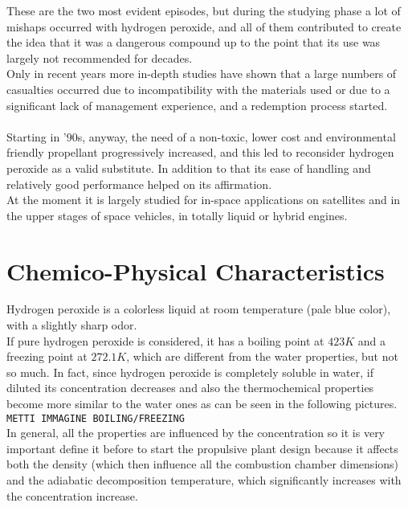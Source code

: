 \documentclass[a4paper]{report}
\begin{document}
These are the two most evident episodes, but during the studying phase a lot of mishaps occurred with hydrogen peroxide, and all of them contributed to create the idea that it was a dangerous compound up to the point that its use was largely not recommended for decades. \\
Only in recent years more in-depth studies have shown that a large numbers of casualties occurred due to incompatibility with the materials used or due to a significant lack of management experience, and a redemption process started. \\ 
\\
Starting in '90s, anyway, the need of a non-toxic, lower cost and environmental friendly propellant progressively increased, and this led to reconsider hydrogen peroxide as a valid substitute. In addition to that its ease of handling and relatively good performance helped on its affirmation.\\
At the moment it is largely studied for in-space applications on satellites and in the upper stages of space vehicles, in totally liquid or hybrid engines. \\

\section{Chemico-Physical Characteristics}

Hydrogen peroxide is a colorless liquid at room temperature (pale blue color), with a slightly sharp odor. \\
If pure hydrogen peroxide is considered, it has a boiling point at $423 K$ and a freezing point at $272.1 K$, which are different from the water properties, but not so much. In fact, since hydrogen peroxide is completely soluble in water, if diluted its concentration decreases and also the thermochemical properties become more similar to the water ones as can be seen in the following pictures. \\

\texttt{\color{red}METTI IMMAGINE BOILING/FREEZING}\\

In general, all the properties are influenced by the concentration so it is very important define it before to start the propulsive plant design because it affects both the density (which then influence all the combustion chamber dimensions) and the adiabatic decomposition temperature, which significantly increases with the concentration increase. \\%
\end{document}
